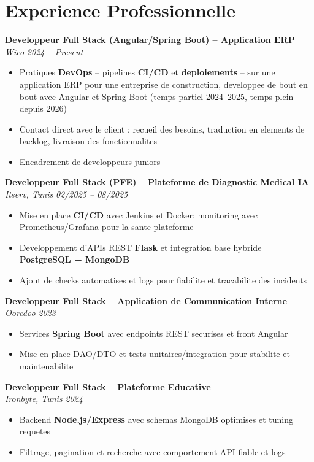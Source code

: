 \documentclass[10pt,a4paper]{article}
\begin{document}
\vspace{6pt}

\section*{Experience Professionnelle}
{\small

\textbf{Developpeur Full Stack (Angular/Spring Boot) -- Application ERP}\\[1pt]
\textit{Wico} \hfill \textit{2024 -- Present}
\begin{itemize}
  \item Pratiques \textbf{DevOps} -- pipelines \textbf{CI/CD} et \textbf{deploiements} -- sur une application ERP pour une entreprise de construction, developpee de bout en bout avec Angular et Spring Boot (temps partiel 2024--2025, temps plein depuis 2026)
  \item Contact direct avec le client : recueil des besoins, traduction en elements de backlog, livraison des fonctionnalites
  \item Encadrement de developpeurs juniors
\end{itemize}

\vspace{3pt}
\textbf{Developpeur Full Stack (PFE) -- Plateforme de Diagnostic Medical IA}\\[1pt]
\textit{Itserv, Tunis} \hfill \textit{02/2025 -- 08/2025}
\begin{itemize}
  \item Mise en place \textbf{CI/CD} avec Jenkins et Docker; monitoring avec Prometheus/Grafana pour la sante plateforme
  \item Developpement d'APIs REST \textbf{Flask} et integration base hybride \textbf{PostgreSQL + MongoDB}
  \item Ajout de checks automatises et logs pour fiabilite et tracabilite des incidents
\end{itemize}

\vspace{3pt}
\textbf{Developpeur Full Stack -- Application de Communication Interne}\\[1pt]
\textit{Ooredoo} \hfill \textit{2023}
\begin{itemize}
  \item Services \textbf{Spring Boot} avec endpoints REST securises et front Angular
  \item Mise en place DAO/DTO et tests unitaires/integration pour stabilite et maintenabilite
\end{itemize}

\vspace{3pt}
\textbf{Developpeur Full Stack -- Plateforme Educative}\\[1pt]
\textit{Ironbyte, Tunis} \hfill \textit{2024}
\begin{itemize}
  \item Backend \textbf{Node.js/Express} avec schemas MongoDB optimises et tuning requetes
  \item Filtrage, pagination et recherche avec comportement API fiable et logs
\end{itemize}

}
\end{document}
